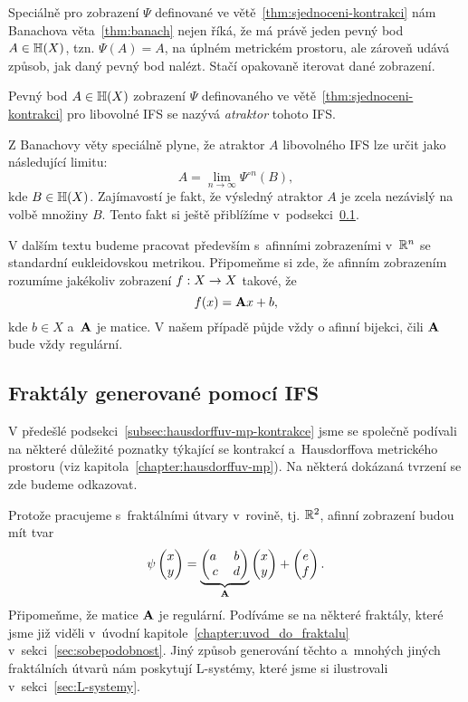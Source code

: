 Speciálně pro zobrazení $\Psi$ definované ve větě~\ref{thm:sjednoceni-kontrakci} nám Banachova věta~\ref{thm:banach} nejen říká, že má právě jeden pevný bod $A\in\mathbb{H}(X)$, tzn. $\Psi(A)=A$, na úplném metrickém prostoru, ale zároveň udává způsob, jak daný pevný bod nalézt. Stačí opakovaně iterovat dané zobrazení.
\begin{definition}[Atraktor]\label{def:atraktor}
    Pevný bod $A\in\mathbb{H}(X)$ zobrazení $\Psi$ definovaného ve větě~\ref{thm:sjednoceni-kontrakci} pro libovolné IFS se nazývá \emph{atraktor} tohoto IFS.
\end{definition}
Z Banachovy věty speciálně plyne, že atraktor $A$ libovolného IFS lze určit jako následující limitu:
\[A=\lim_{n\to\infty}\Psi^{\circ n}(B),\]
kde $B\in\mathbb{H}(X)$. Zajímavostí je fakt, že výsledný atraktor $A$ je zcela nezávislý na volbě množiny $B$. Tento fakt si ještě přiblížíme v~podsekci~\ref{subsec:fraktaly-ifs}.

V dalším textu budeme pracovat především s~afinními zobrazeními v~$\mathbb{R}^n$ se standardní eukleidovskou metrikou. Připomeňme si zde, že afinním zobrazením rozumíme jakékoliv zobrazení $f:X \rightarrow X$ takové, že
\[f(x)=\mathbf{A}x+b,\]
kde $b\in X$ a~$\mathbf{A}$ je matice. V našem případě půjde vždy o afinní bijekci, čili $\mathbf{A}$ bude vždy regulární.

\subsection{Fraktály generované pomocí IFS}\label{subsec:fraktaly-ifs}

V předešlé podsekci~\ref{subsec:hausdorffuv-mp-kontrakce} jsme se společně podívali na některé důležité poznatky týkající se kontrakcí a~Hausdorffova metrického prostoru (viz kapitola~\ref{chapter:hausdorffuv-mp}). Na některá dokázaná tvrzení se zde budeme odkazovat.

Protože pracujeme s~fraktálními útvary v~rovině, tj. $\mathbb{R}^2$, afinní zobrazení budou mít tvar
\begin{equation}\label{eq:afinita-v-R2}
    \psi\left(\begin{matrix}
        x\\
        y
    \end{matrix}\right)=\underbrace{\left(\begin{matrix}
        a~& b\\
        c & d
    \end{matrix}\right)}_{\mathbf{A}}\left(\begin{matrix}
        x\\
        y
    \end{matrix}\right)+\left(\begin{matrix}
        e\\
        f
    \end{matrix}\right).
\end{equation}
Připomeňme, že matice $\mathbf{A}$ je regulární. Podíváme se na některé fraktály, které jsme již viděli v~úvodní kapitole~\ref{chapter:uvod_do_fraktalu} v~sekci~\ref{sec:sobepodobnost}. Jiný způsob generování těchto a~mnohých jiných fraktálních útvarů nám poskytují L-systémy, které jsme si ilustrovali v~sekci~\ref{sec:L-systemy}.

